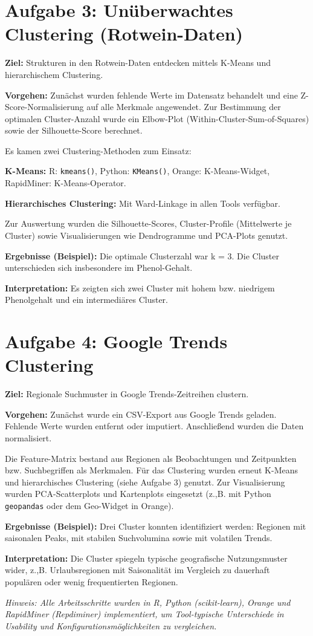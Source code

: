 \documentclass[a4paper,12pt]{scrartcl}
\begin{document}
\section*{Aufgabe 3: Unüberwachtes Clustering (Rotwein-Daten)}

\textbf{Ziel:} Strukturen in den Rotwein-Daten entdecken mittels K-Means und hierarchischem Clustering.\

\textbf{Vorgehen:} Zunächst wurden fehlende Werte im Datensatz behandelt und eine Z-Score-Normalisierung auf alle Merkmale angewendet. Zur Bestimmung der optimalen Cluster-Anzahl wurde ein Elbow-Plot (Within-Cluster-Sum-of-Squares) sowie der Silhouette-Score berechnet.

Es kamen zwei Clustering-Methoden zum Einsatz:

\textbf{K-Means:} R: \lstinline|kmeans()|, Python: \lstinline|KMeans()|, Orange: K-Means-Widget, RapidMiner: K-Means-Operator.

\textbf{Hierarchisches Clustering:} Mit Ward-Linkage in allen Tools verfügbar.

Zur Auswertung wurden die Silhouette-Scores, Cluster-Profile (Mittelwerte je Cluster) sowie Visualisierungen wie Dendrogramme und PCA-Plots genutzt.

\textbf{Ergebnisse (Beispiel):} Die optimale Clusterzahl war k = 3. Die Cluster unterschieden sich insbesondere im Phenol-Gehalt.

\textbf{Interpretation:} Es zeigten sich zwei Cluster mit hohem bzw. niedrigem Phenolgehalt und ein intermediäres Cluster.

\newpage

\section*{Aufgabe 4: Google Trends Clustering}

\textbf{Ziel:} Regionale Suchmuster in Google Trends-Zeitreihen clustern.\

\textbf{Vorgehen:} Zunächst wurde ein CSV-Export aus Google Trends geladen. Fehlende Werte wurden entfernt oder imputiert. Anschließend wurden die Daten normalisiert.

Die Feature-Matrix bestand aus Regionen als Beobachtungen und Zeitpunkten bzw. Suchbegriffen als Merkmalen. Für das Clustering wurden erneut K-Means und hierarchisches Clustering (siehe Aufgabe 3) genutzt. Zur Visualisierung wurden PCA-Scatterplots und Kartenplots eingesetzt (z.,B. mit Python \lstinline|geopandas| oder dem Geo-Widget in Orange).

\textbf{Ergebnisse (Beispiel):} Drei Cluster konnten identifiziert werden: Regionen mit saisonalen Peaks, mit stabilen Suchvolumina sowie mit volatilen Trends.

\textbf{Interpretation:} Die Cluster spiegeln typische geografische Nutzungsmuster wider, z.,B. Urlaubsregionen mit Saisonalität im Vergleich zu dauerhaft populären oder wenig frequentierten Regionen.

\vspace{1em}
\noindent\textit{Hinweis: Alle Arbeitsschritte wurden in R, Python (scikit-learn), Orange und RapidMiner (Repdiminer) implementiert, um Tool-typische Unterschiede in Usability und Konfigurationsmöglichkeiten zu vergleichen.}
\end{document}
